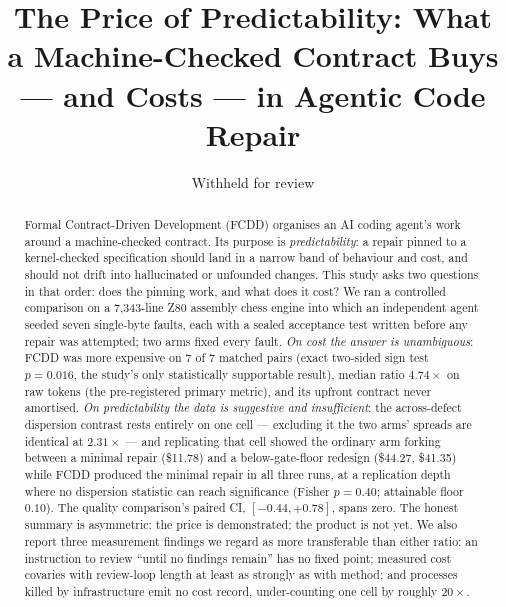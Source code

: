 \documentclass[runningheads]{llncs}
\begin{document}
\title{The Price of Predictability: What a Machine-Checked Contract Buys ---
and Costs --- in Agentic Code Repair}

\author{Withheld for review}

\maketitle

\begin{abstract}
Formal Contract-Driven Development (FCDD) organises an AI coding agent's work
around a machine-checked contract. Its purpose is \emph{predictability}: a
repair pinned to a kernel-checked specification should land in a narrow band
of behaviour and cost, and should not drift into hallucinated or unfounded
changes. This study asks two questions in that order: does the pinning work,
and what does it cost? We ran a controlled comparison on a 7{,}343-line Z80
assembly chess engine into which an independent agent seeded seven
single-byte faults, each with a sealed acceptance test written before any
repair was attempted; two arms fixed every fault. \emph{On cost the answer is
unambiguous}: FCDD was more expensive on 7 of 7 matched pairs (exact
two-sided sign test $p=0.016$, the study's only statistically supportable
result), median ratio $4.74\times$ on raw tokens (the pre-registered primary
metric), and its upfront contract never amortised. \emph{On predictability
the data is suggestive and insufficient}: the across-defect dispersion
contrast rests entirely on one cell --- excluding it the two arms' spreads
are identical at $2.31\times$ --- and replicating that cell showed the
ordinary arm forking between a minimal repair (\$11.78) and a
below-gate-floor redesign (\$44.27, \$41.35) while FCDD produced the minimal
repair in all three runs, at a replication depth where no dispersion
statistic can reach significance (Fisher $p=0.40$; attainable floor $0.10$).
The quality comparison's paired CI, $[-0.44,+0.78]$, spans zero. The honest
summary is asymmetric: the price is demonstrated; the product is not yet. We
also report three measurement findings we regard as more transferable than
either ratio: an instruction to review ``until no findings remain'' has no
fixed point; measured cost covaries with review-loop length at least as
strongly as with method; and processes killed by infrastructure emit no cost
record, under-counting one cell by roughly $20\times$.

\end{abstract}
\end{document}
